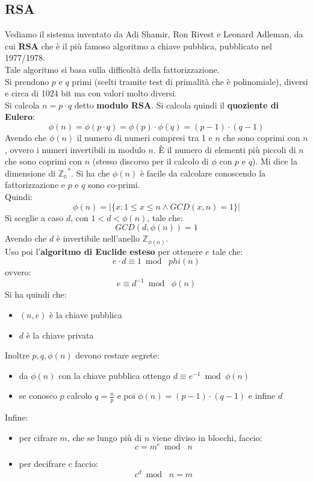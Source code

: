 \documentclass[a4paper,12pt, oneside]{book}
\begin{document}
\subsection{RSA}
Vediamo il sistema inventato da Adi Shamir, Ron Rivest e Leonard Adleman, da cui
\textbf{RSA} che è il più famoso algoritmo a chiave pubblica, pubblicato nel
1977/1978.\\
Tale algoritmo si basa sulla difficoltà della fattorizzazione.\\
Si prendono $p$ e $q$ primi (scelti tramite test di primalità che è
polinomiale), diversi e circa di 1024 bit ma con valori molto 
diversi.\\
Si calcola $n=p\cdot q$ detto \textbf{modulo RSA}. Si calcola quindi il
\textbf{quoziente di Eulero}:
\[\phi(n)=\phi(p\cdot q)=\phi(p)\cdot \phi(q)=(p-1)\cdot (q-1)\]
Avendo che $\phi(n)$ il numero di numeri compresi tra 1 e $n$ che sono coprimi
con $n$, ovvero i numeri invertibili in modulo $n$. È il numero di elementi più
piccoli di $n$ che sono coprimi con $n$ (stesso discorso per il calcolo di
$\phi$ con $p$ e $q$). Mi dice la dimensione di
$\mathbb{Z_{n}}^*$.
Si ha che $\phi(n)$ è facile da calcolare conoscendo la fattorizzazione e $p$ e
$q$ sono co-primi.\\
Quindi:
\[\phi(n)=|\{x:1\leq x\leq n\land GCD(x,n)=1\}|\]
Si sceglie a caso $d$, con $1<d<\phi(n)$, tale che:
\[GCD(d,\phi(n))=1\]
Avendo che $d$ è invertibile nell'anello $\mathbb{Z}_{\phi(n)}$.\\
Uso poi l'\textbf{algoritmo di Euclide esteso} per ottenere $e$ tale che:
\[e\cdot d\equiv 1\bmod \,\,phi(n)\]
ovvero:
\[e\equiv d^{-1}\bmod\,\,\phi(n)\]
Si ha quindi che:
\begin{itemize}
  \item $(n,e)$ è la chiave pubblica
  \item $d$ è la chiave privata
\end{itemize}
Inoltre $p,q,\phi(n)$ devono restare segrete:
\begin{itemize}
  \item da $\phi(n)$ con la chiave pubblica ottengo $d\equiv e^{-1}\bmod\phi(n)$
  \item se conosco $p$ calcolo $q=\frac{n}{p}$ e poi $\phi(n)=(p-1)\cdot (q-1)$
  e infine $d$
\end{itemize}
Infine:
\begin{itemize}
  \item per cifrare $m$, che se lungo più di $n$ viene diviso in blocchi, faccio:
  \[c=m^e\bmod\,\,n\]
  \item per decifrare $c$ faccio:
  \[c^d\bmod\,\,n=m\]
\end{itemize}
\end{document}
